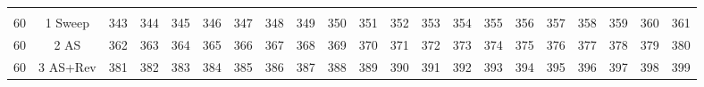 \begin{table}[H]
{\begin{tabular}{ccccccccccccccccccccc}
 &  &  &  &  &  &  &  &  &  &  &  &  &  &  &  &  &  &  &  &  \\
\rowcolor[HTML]{ECF4FF} 
60 & 1 Sweep & 343 & 344 & 345 & 346 & 347 & 348 & 349 & 350 & 351 & 352 & 353 & 354 & 355 & 356 & 357 & 358 & 359 & 360 & 361 \\
\rowcolor[HTML]{FFFFC7} 
60 & 2 AS & 362 & 363 & 364 & 365 & 366 & 367 & 368 & 369 & 370 & 371 & 372 & 373 & 374 & 375 & 376 & 377 & 378 & 379 & 380 \\
\rowcolor[HTML]{FFCCC9} 
60 & 3 AS+Rev & 381 & 382 & 383 & 384 & 385 & 386 & 387 & 388 & 389 & 390 & 391 & 392 & 393 & 394 & 395 & 396 & 397 & 398 & 399
\end{tabular}%
}
\end{table}